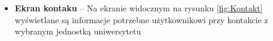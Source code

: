 \documentclass{iiuwb}
\begin{document}
\begin{itemize}
\item \textbf{Ekran kontaku} -- Na ekranie widocznym na rysunku \ref{fig:Kontakt} wyświetlane są informacje potrzebne użytkownikowi przy kontakcie z wybranym jednostką uniwersytetu                                                                                                                                                                                                                                                                                                                                                                                                                                                                                                                                                                                                                                                                                                                                                                                                                                                                                                                                                                                                                                                                                                                                                                                                                                                                                                                                                                                                                                                                                                                                                                                                                                                                                                                                                                                                                                                                                                                                                                                                                                                                                                                                                                                                                                                                                                                                                                                                                                                                                                                                                                                                                                                                                                                                                                                                                                                                                                                                                                                                                                                                                                                                    
\end{itemize}
\end{document}
